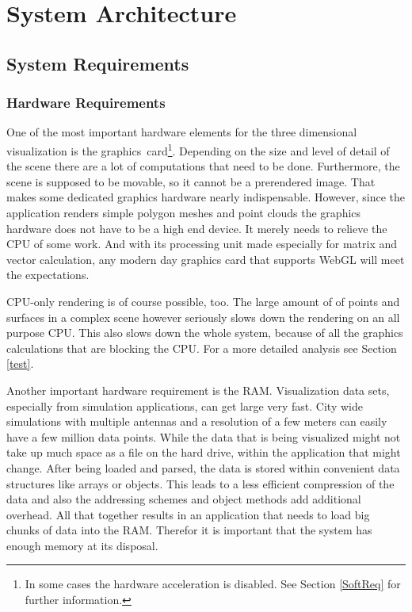 \chapter{System Architecture}
\section{System Requirements}
\subsection{Hardware Requirements}
One of the most important hardware elements for the three dimensional visualization is the graphics~card\footnote{In some cases the hardware acceleration is disabled. See Section \ref{SoftReq} for further information.}. Depending on the size and level of detail of the scene there are a lot of computations that need to be done. Furthermore, the scene is supposed to be movable, so it cannot be a prerendered image. That makes some dedicated graphics hardware nearly indispensable. However, since the application renders simple polygon meshes and point clouds the graphics hardware does not have to be a high end device. It merely needs to relieve the CPU of some work. And with its processing unit made especially for matrix and vector calculation, any modern day graphics card that supports WebGL will meet the expectations.

CPU-only rendering is of course possible, too. The large amount of of points and surfaces in a complex scene however seriously slows down the rendering on an all purpose CPU. This also slows down the whole system, because of all the graphics calculations that are blocking the CPU. For a more detailed analysis see Section \ref{test}.

Another important hardware requirement is the RAM. Visualization data sets, especially from simulation applications, can get large very fast. City wide simulations with multiple antennas and a resolution of a few meters can easily have a few million data points. While the data that is being visualized might not take up much space as a file on the hard drive, within the application that might change. After being loaded and parsed, the data is stored within convenient data structures like arrays or objects. This leads to a less efficient compression of the data and also the addressing schemes and object methods add additional overhead. All that together results in an application that needs to load big chunks of data into the RAM. Therefor it is important that the system has enough memory at its disposal.

